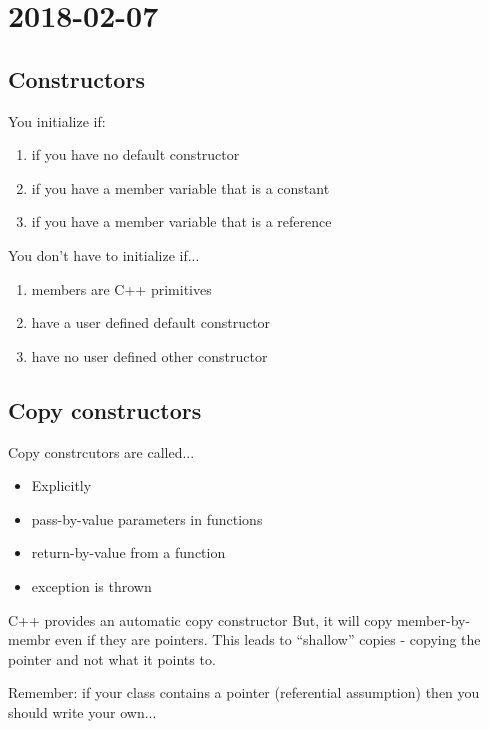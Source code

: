 \section{2018-02-07}

\subsection{Constructors}

You initialize if:

\begin{enumerate}
  \item if you have no default constructor
  \item if you have a member variable that is a constant
  \item if you have a member variable that is a reference
\end{enumerate}

You don't have to initialize if...

\begin{enumerate}
  \item members are C++ primitives
  \item have a user defined default constructor
  \item have no user defined other constructor 
\end{enumerate}

\subsection{Copy constructors}


Copy constrcutors are called...

\begin{itemize}
  \item Explicitly
  \item pass-by-value parameters in functions
  \item return-by-value from a function
  \item exception is thrown
\end{itemize}

C++ provides an automatic copy constructor But, it will copy member-by-membr even if they are pointers. This leads to ``shallow'' copies - copying the pointer and not what it points to.

Remember: if your class contains a pointer (referential assumption) then you should write your own...

